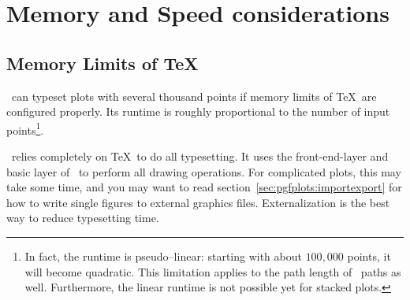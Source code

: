 \section{Memory and Speed considerations}
\subsection{Memory Limits of \TeX}
\label{sec:pgfplots:optimization}
\PGFPlots\ can typeset plots with several thousand points if memory limits of \TeX\ are configured properly. Its runtime is roughly proportional to the number of input points\footnote{In fact, the runtime is pseudo--linear: starting with about $100{,}000$ points, it will become quadratic. This limitation applies to the path length of \PGF\ paths as well. Furthermore, the linear runtime is not possible yet for stacked plots.}.

\pgfplotsexpensiveexample
\begin{codeexample}[]
\end{codeexample}

\pgfplotsexpensiveexample
\begin{codeexample}[]
\end{codeexample}

\PGFPlots\ relies completely on \TeX\ to do all typesetting. It uses the front-end-layer and basic layer of \PGF\ to perform all drawing operations. For complicated plots, this may take some time, and you may want to read section~\ref{sec:pgfplots:importexport} for how to write single figures to external graphics files. Externalization is the best way to reduce typesetting time.

